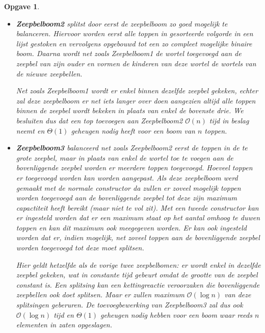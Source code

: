 \documentclass[12pt,hidelinks]{article}
\newtheorem{opgave}{Opgave}
\begin{document}
\begin{opgave}
\begin{enumerate}[a.]
\begin{itemize}
                        We kunnen dus concluderen dat voor Zeepbelboom1 met $n$ toppen de toevoegbewerking $\mathcal{O}(n)$ tijd in beslag neemt en $\Theta(1)$ geheugen nodig heeft.

                    \item \textbf{Zeepbelboom2} splitst door eerst de zeepbelboom zo goed mogelijk te balanceren. 
                        Hiervoor worden eerst alle toppen in gesorteerde volgorde in een lijst gestoken en vervolgens opgebouwd tot een zo compleet mogelijke binaire boom. 
                        Daarna wordt net zoals Zeepbelboom1 de wortel toegevoegd aan de zeepbel van zijn ouder en vormen de kinderen van deze wortel de wortels van de nieuwe zeepbellen.

                        Net zoals Zeepbelboom1 wordt er enkel binnen dezelfde zeepbel gekeken, echter zal deze zeepbelboom er net iets langer over doen aangezien altijd alle toppen binnen de zeepbel wordt bekeken in plaats van enkel de bovenste drie. 
                        We besluiten dus dat een top toevoegen aan Zeepbelboom2 $\mathcal{O}(n)$ tijd in beslag neemt en $\Theta(1)$ geheugen nodig heeft voor een boom van $n$ toppen.
                    \item \textbf{Zeepbelboom3} balanceerd net zoals Zeepbelboom2 eerst de toppen in de te grote zeepbel, maar in plaats van enkel de wortel toe te voegen aan de bovenliggende zeepbel worden er meerdere toppen toegevoegd.
                        Hoeveel toppen er toegevoegd worden kan worden aangepast. 
                        Als deze zeepbelboom werd gemaakt met de normale constructor da zullen er zoveel mogelijk toppen worden toegevoegd aan de bovenliggende zeepbel tot deze zijn maximum capactiteit heeft bereikt (maar niet te vol zit).
                        Met een tweede constructor kan er ingesteld worden dat er een maximum staat op het aantal omhoog te duwen toppen en kan dit maximum ook meegegeven worden.
                        Er kan ook ingesteld worden dat er, indien mogelijk, net zoveel toppen aan de bovenliggende zeepbel worden toegevoegd tot deze moet splitsen.

                        Hier geldt hetzelfde als de vorige twee zeepbelbomen: er wordt enkel in dezelfde zeepbel gekeken, wat in constante tijd gebeurt omdat de grootte van de zeepbel constant is.
                        Een splitsing kan een kettingreactie veroorzaken die bovenliggende zeepbellen ook doet splitsen. Maar er zullen maximum $\mathcal{O}(\log n)$ van deze splitsingen geberuren.
                        De toevoegbewerking van Zeepbelboom3 zal dus ook $\mathcal{O}(\log n)$ tijd en $\Theta(1)$ geheugen nodig hebben voor een boom waar reeds $n$ elementen in zaten
                        opgeslagen.
                \end{itemize}



\end{enumerate}
\end{opgave}
\end{document}
